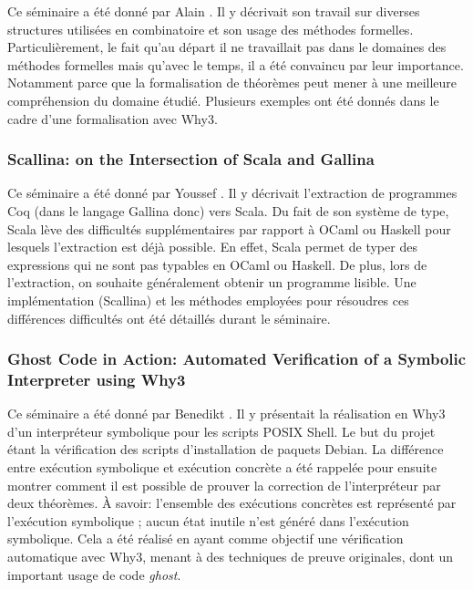       Ce séminaire a été donné par Alain . Il y décrivait son travail sur diverses structures utilisées en combinatoire et son usage des méthodes formelles. Particulièrement, le fait qu'au départ il ne travaillait pas dans le domaines des méthodes formelles mais qu'avec le temps, il a été convaincu par leur importance. Notamment parce que la formalisation de théorèmes peut mener à une meilleure compréhension du domaine étudié. Plusieurs exemples ont été donnés dans le cadre d'une formalisation avec Why3.

    \subsubsection{Scallina: on the Intersection of Scala and Gallina}

	Ce séminaire a été donné par Youssef . Il y décrivait l'extraction de programmes Coq (dans le langage Gallina donc) vers Scala. Du fait de son système de type, Scala lève des difficultés supplémentaires par rapport à OCaml ou Haskell pour lesquels l'extraction est déjà possible. En effet, Scala permet de typer des expressions qui ne sont pas typables en OCaml ou Haskell. De plus, lors de l'extraction, on souhaite généralement obtenir un programme lisible. Une implémentation (Scallina) et les méthodes employées pour résoudres ces différences difficultés ont été détaillés durant le séminaire.

    \subsubsection{Ghost Code in Action: Automated Verification of a Symbolic Interpreter using Why3}

	Ce séminaire a été donné par Benedikt . Il y présentait la réalisation en Why3 d'un interpréteur symbolique pour les scripts POSIX Shell. Le but du projet étant la vérification des scripts d'installation de paquets Debian. La différence entre exécution symbolique et exécution concrète a été rappelée pour ensuite montrer comment il est possible de prouver la correction de l'interpréteur par deux théorèmes. À savoir: l'ensemble des exécutions concrètes est représenté par l'exécution symbolique ; aucun état inutile n'est généré dans l'exécution symbolique. Cela a été réalisé en ayant comme objectif une vérification automatique avec Why3, menant à des techniques de preuve originales, dont un important usage de code \emph{ghost}.
